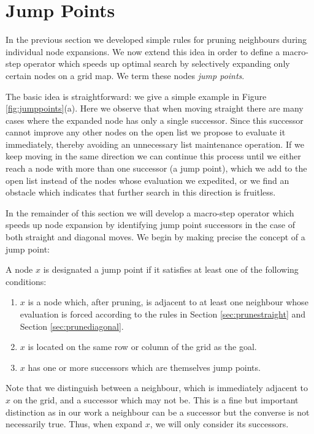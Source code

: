 \section{Jump Points}
In the previous section we developed simple rules for pruning neighbours during 
individual node expansions. We now extend this idea in order to define a 
macro-step operator which speeds up optimal search by selectively expanding
only certain nodes on a grid map. We term these nodes \emph{jump points}.
\par
The basic idea is straightforward: we give a simple example in Figure 
\ref{fig:jumppoints}(a).
Here we observe that when moving straight there are many cases where
the expanded node has only a single successor.
Since this successor cannot improve any other nodes on the open list we 
propose to evaluate it immediately, thereby avoiding an unnecessary list
maintenance operation. 
If we keep moving in the same direction we can continue this process until we 
either reach a node with more than one successor (a jump point), which we add to the open list instead of the nodes whose evaluation we expedited, or we find an 
obstacle which indicates that further search in this direction is fruitless.
\par
In the remainder of this section we will develop a macro-step operator which 
speeds up node expansion by identifying jump point successors in the case of
both straight and diagonal moves. We begin by making precise the concept of a
jump point:

\begin{definition}
\label{def:jump}
A node $x$ is designated a jump point if it satisfies at least one of the following
conditions:
\begin{enumerate}
\item{$x$ is a node which, after pruning, is adjacent to at least one neighbour
whose evaluation is forced according to the rules in Section
\ref{sec:prunestraight} and Section \ref{sec:prunediagonal}.}
\item{$x$ is located on the same row or column of the grid as the goal.}
\item{$x$ has one or more successors which are themselves jump points.}
\end{enumerate}
\end{definition}

Note that we distinguish between a neighbour, which is immediately adjacent to
$x$ on the grid, and a successor which may not be. 
This is a fine but important distinction as in our work a neighbour can be a 
successor but the converse is not necessarily true.
Thus, when expand $x$, we will only consider its successors.


